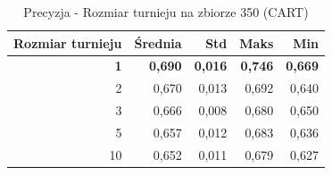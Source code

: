 \begin{table}[htbp]
\centering
\small
\setlength{\tabcolsep}{6pt}
\renewcommand{\arraystretch}{1.2}
\caption{Precyzja - Rozmiar turnieju na zbiorze 350 (CART)}
\label{tab:CART_tournament_size_350_precision}
\begin{tabular}{r|r|r|r|r}
\toprule
Rozmiar turnieju & Średnia & Std & Maks & Min \\
\hline
\textbf{1} & \textbf{0,690} & \textbf{0,016} & \textbf{0,746} & \textbf{0,669} \\
2 & 0,670 & 0,013 & 0,692 & 0,640 \\
3 & 0,666 & 0,008 & 0,680 & 0,650 \\
5 & 0,657 & 0,012 & 0,683 & 0,636 \\
10 & 0,652 & 0,011 & 0,679 & 0,627 \\
\bottomrule
\end{tabular}
\end{table}